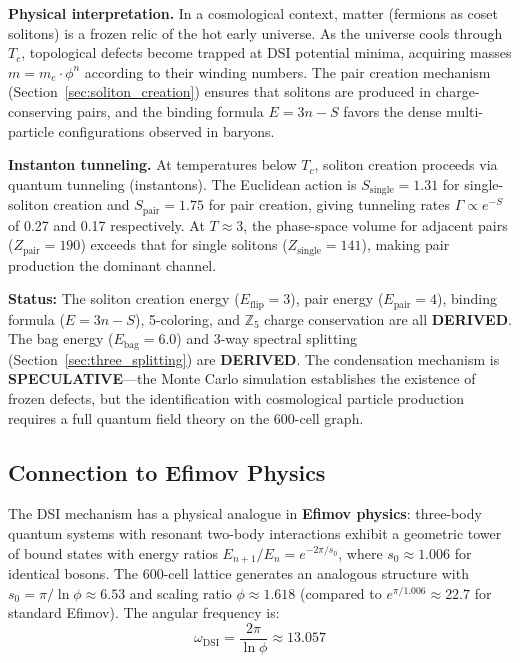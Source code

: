 \documentclass[12pt,a4paper]{article}
\begin{document}
\textbf{Physical interpretation.} In a cosmological context, matter (fermions as coset solitons) is a frozen relic of the hot early universe. As the universe cools through $T_c$, topological defects become trapped at DSI potential minima, acquiring masses $m = m_e \cdot \phi^n$ according to their winding numbers. The pair creation mechanism (Section~\ref{sec:soliton_creation}) ensures that solitons are produced in charge-conserving pairs, and the binding formula $E = 3n - S$ favors the dense multi-particle configurations observed in baryons.

\textbf{Instanton tunneling.} At temperatures below $T_c$, soliton creation proceeds via quantum tunneling (instantons). The Euclidean action is $S_{\text{single}} = 1.31$ for single-soliton creation and $S_{\text{pair}} = 1.75$ for pair creation, giving tunneling rates $\Gamma \propto e^{-S}$ of 0.27 and 0.17 respectively. At $T \approx 3$, the phase-space volume for adjacent pairs ($Z_{\text{pair}} = 190$) exceeds that for single solitons ($Z_{\text{single}} = 141$), making pair production the dominant channel.

\textbf{Status:} The soliton creation energy ($E_{\text{flip}} = 3$), pair energy ($E_{\text{pair}} = 4$), binding formula ($E = 3n - S$), 5-coloring, and $\mathbb{Z}_5$ charge conservation are all \textbf{DERIVED}. The bag energy ($E_{\text{bag}} = 6.0$) and 3-way spectral splitting (Section~\ref{sec:three_splitting}) are \textbf{DERIVED}. The condensation mechanism is \textbf{SPECULATIVE}---the Monte Carlo simulation establishes the existence of frozen defects, but the identification with cosmological particle production requires a full quantum field theory on the 600-cell graph.

\subsection{Connection to Efimov Physics}

The DSI mechanism has a physical analogue in \textbf{Efimov physics}: three-body quantum systems with resonant two-body interactions exhibit a geometric tower of bound states with energy ratios $E_{n+1}/E_n = e^{-2\pi/s_0}$, where $s_0 \approx 1.006$ for identical bosons. The 600-cell lattice generates an analogous structure with $s_0 = \pi/\ln\phi \approx 6.53$ and scaling ratio $\phi \approx 1.618$ (compared to $e^{\pi/1.006} \approx 22.7$ for standard Efimov). The angular frequency is:
\begin{equation}
\omega_{\text{DSI}} = \frac{2\pi}{\ln\phi} \approx 13.057
\end{equation}
\end{document}
